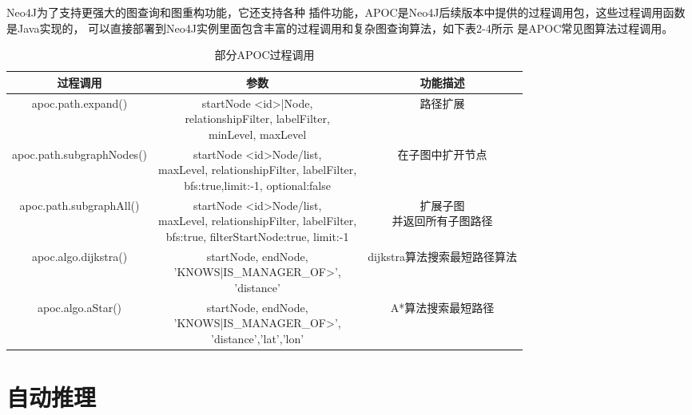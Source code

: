\documentclass{standalone}
\begin{document}
Neo4J为了支持更强大的图查询和图重构功能，它还支持各种
插件功能，APOC是Neo4J后续版本中提供的过程调用包，这些过程调用函数是Java实现的，
可以直接部署到Neo4J实例里面包含丰富的过程调用和复杂图查询算法，如下表2-4所示
是APOC常见图算法过程调用。 
\begin{table}[h]
	\caption{部分APOC过程调用} 
	\begin{tabular}{|c|c|c|} 
		\hline  
		过程调用 & 参数 & 功能描述\\
		\hline 
		apoc.path.expand() & \makecell[l]{startNode <id>|Node, \\relationshipFilter, labelFilter,\\ minLevel, maxLevel} 
		& 路径扩展 
		\\  
		\hline  
		apoc.path.subgraphNodes() &\makecell[l]{startNode <id>Node/list,\\maxLevel, relationshipFilter, labelFilter,\\ bfs:true,limit:-1, optional:false} 
		& 在子图中扩开节点 
		\\  
		\hline  
		apoc.path.subgraphAll() & \makecell[l]{startNode <id>Node/list,\\maxLevel, relationshipFilter, labelFilter,\\ bfs:true, filterStartNode:true, limit:-1} 
		& \makecell[l]{扩展子图 \\并返回所有子图路径}
		\\  
		\hline 
		apoc.algo.dijkstra() & \makecell[l]{startNode, endNode,\\'KNOWS|IS\_MANAGER\_OF>',\\ 'distance'} 
		& dijkstra算法搜索最短路径算法
		\\  
		\hline 
		apoc.algo.aStar() & \makecell[l]{startNode, endNode,\\'KNOWS|IS\_MANAGER\_OF>',\\ 'distance','lat','lon'} 
		& A*算法搜索最短路径
		\\  
		\hline 
	\end{tabular}
	\label{tablea}
\end{table}
\section{自动推理}
\end{document}
